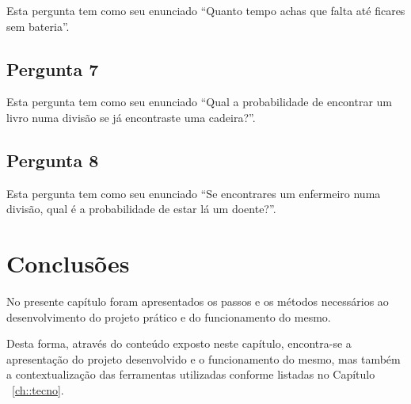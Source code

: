 Esta pergunta tem como seu enunciado ``Quanto tempo achas que falta até ficares sem bateria''.


\subsection{Pergunta 7}
\label{ssec::implement:details:perg7}

Esta pergunta tem como seu enunciado ``Qual a probabilidade de encontrar um livro numa divisão se já encontraste uma cadeira?''.


\subsection{Pergunta 8}
\label{ssec::implement:details:perg8}

Esta pergunta tem como seu enunciado ``Se encontrares um enfermeiro numa divisão, qual é a probabilidade de estar lá um doente?''.


\section{Conclusões}
\label{sec::implement:conc}

No presente capítulo foram apresentados os passos e os métodos necessários ao desenvolvimento do projeto prático e do funcionamento do mesmo. 

Desta forma, através do conteúdo exposto neste capítulo, encontra-se a apresentação do projeto desenvolvido e o funcionamento do mesmo, mas também a contextualização das ferramentas utilizadas conforme listadas no Capítulo ~\ref{ch::tecno}.